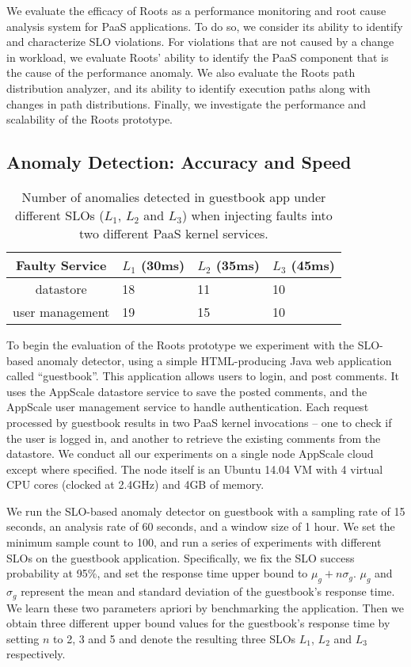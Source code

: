 We evaluate the efficacy of Roots as a performance monitoring and root cause
analysis system for PaaS applications.
To do so, we consider its ability to identify and characterize SLO violations.
For violations that are not caused by a change in workload, we evaluate Roots' ability to identify
the PaaS component that is the cause of the performance anomaly. We also
evaluate the Roots path distribution analyzer, and its ability to identify
execution paths along with changes in path distributions.
Finally, we investigate the performance and scalability of the Roots
prototype. 

\subsection{Anomaly Detection: Accuracy and Speed}

\begin{table}
\begin{center}
\begin{tabular}{|c|p{1cm}|p{1cm}|p{1cm}|}
\hline
Faulty Service & $L_1$ (30ms) & $L_2$ (35ms) & $L_3$ (45ms) \\ \hline
datastore & 18 & 11 & 10 \\ \hline
user management & 19 & 15 & 10 \\ \hline
\end{tabular}
\end{center}
\caption{Number of anomalies detected in guestbook app under different SLOs 
($L_1$, $L_2$ and $L_3$) when injecting faults into two different PaaS kernel services.
\label{tab:anomaly_counts}
}
\end{table}

To begin the evaluation of the Roots prototype we experiment with
the SLO-based anomaly detector, using a simple HTML-producing Java 
web application called ``guestbook''.
This application allows users to login, and post comments. It uses the
AppScale  datastore service to save
the posted comments, and the AppScale user management service to handle authentication. Each request processed
by guestbook results in two PaaS kernel invocations -- one to check if the user is logged in, and 
another to retrieve the existing comments from the datastore. We conduct all
our experiments on a single node AppScale cloud except where specified. The node itself is an Ubuntu
14.04 VM with 4 virtual CPU cores (clocked at 2.4GHz) and 4GB of memory.

We run the SLO-based anomaly detector on guestbook with a sampling rate of 15 seconds, an analysis
rate of 60 seconds, and a window size of 1 hour. We set the minimum sample count to 100, and
run a series of experiments with different SLOs on the guestbook application. Specifically, we fix
the SLO success probability at 95\%, and set the response time upper bound to $\mu_g + n\sigma_g$. 
$\mu_g$ and $\sigma_g$ represent the mean and standard deviation of the
guestbook's response time. We learn these two parameters apriori by benchmarking
the application. Then we obtain three different upper bound values for the guestbook's
response time by setting 
$n$ to 2, 3 and 5 and denote the resulting three SLOs $L_1$, $L_2$ and $L_3$ respectively.

